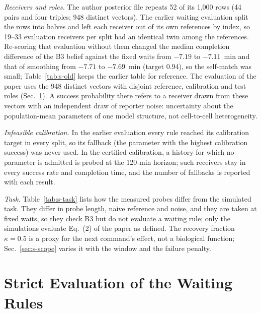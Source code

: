 \documentclass[conference]{IEEEtran}
\begin{document}
\emph{Receivers and roles.} The author posterior file repeats 52 of its 1,000 rows (44 pairs and four triples; 948 distinct vectors). The earlier waiting evaluation split the rows into halves and left each receiver out of its own references by index, so 19--33 evaluation receivers per split had an identical twin among the references. Re-scoring that evaluation without them changed the median completion difference of the B3 belief against the fixed waits from $-7.19$ to $-7.11$~min and that of smoothing from $-7.71$ to $-7.69$~min (target 0.94), so the self-match was small; Table~\ref{tab:s-old} keeps the earlier table for reference. The evaluation of the paper uses the 948 distinct vectors with disjoint reference, calibration and test roles (Sec.~\ref{sec:s-strict}). A success probability there refers to a receiver drawn from these vectors with an independent draw of reporter noise: uncertainty about the population-mean parameters of one model structure, not cell-to-cell heterogeneity.

\emph{Infeasible calibration.} In the earlier evaluation every rule reached its calibration target in every split, so its fallback (the parameter with the highest calibration success) was never used. In the certified calibration, a history for which no parameter is admitted is probed at the 120-min horizon; such receivers stay in every success rate and completion time, and the number of fallbacks is reported with each result.

\emph{Task.} Table~\ref{tab:s-task} lists how the measured probes differ from the simulated task. They differ in probe length, naive reference and noise, and they are taken at fixed waits, so they check B3 but do not evaluate a waiting rule; only the simulations evaluate Eq.~(2) of the paper as defined. The recovery fraction $\kappa=0.5$ is a proxy for the next command's effect, not a biological function; Sec.~\ref{sec:s-scope} varies it with the window and the failure penalty.

\begin{table}[t]
\caption{Earlier evaluation (Table~II of the previous version): halves of the 1,000 posterior rows, leave-one-out references, target 0.94 chosen after evaluation. $\Delta T$, $G$ (gap to the oracle closed), Met: 20 splits.}
\label{tab:s-old}
\centering\footnotesize\setlength{\tabcolsep}{2.2pt}

\end{table}

\section{Strict Evaluation of the Waiting Rules}
\label{sec:s-strict}
\begin{table}[t]
\caption{Strict evaluation per history (certified arm, primary split, noise s.d.\ 0.005): failure-penalized completion $T_m$, completion among successes $T_m^{\rm s}$ (min) and paired difference to the fixed waits with 95\% bootstrap interval.}
\label{tab:s-history}
\centering\footnotesize\setlength{\tabcolsep}{1.1pt}

\end{table}
\end{document}
